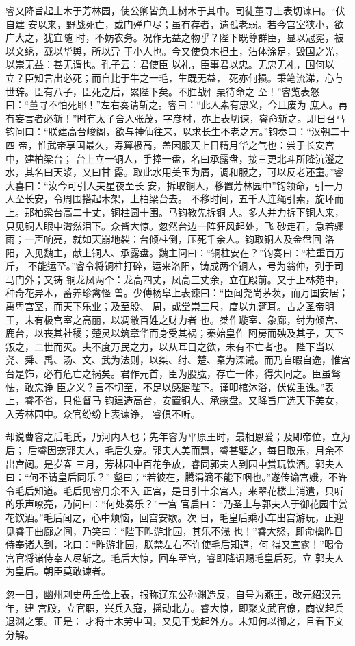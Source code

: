 睿又降旨起土木于芳林园，使公卿皆负土树木于其中。司徒董寻上表切谏曰。“伏自建
安以来，野战死亡，或门殚户尽；虽有存者，遗孤老弱。若今宫室狭小，欲广大之，犹宜随
时，不妨农务。况作无益之物乎？陛下既尊群臣，显以冠冕，被以文绣，载以华舆，所以异
于小人也。今又使负木担土，沾体涂足，毁国之光，以崇无益：甚无谓也。孔子云：君使臣
以礼，臣事君以忠。无忠无礼，国何以立？臣知言出必死；而自比于牛之一毛，生既无益，
死亦何损。秉笔流涕，心与世辞。臣有八子，臣死之后，累陛下矣。不胜战忄栗待命之
至！”睿览表怒曰：“董寻不怕死耶！”左右奏请斩之。睿曰：“此人素有忠义，今且废为
庶人。再有妄言者必斩！”时有太子舍人张茂，字彦材，亦上表切谏，睿命斩之。即日召马
钧问曰：“朕建高台峻阁，欲与神仙往来，以求长生不老之方。”钧奏曰：“汉朝二十四
帝，惟武帝享国最久，寿算极高，盖因服天上日精月华之气也：尝于长安宫中，建柏梁台；
台上立一铜人，手捧一盘，名曰承露盘，接三更北斗所降沆瀣之水，其名曰天浆，又曰甘
露。取此水用美玉为屑，调和服之，可以反老还童。”睿大喜曰：“汝今可引人夫星夜至长
安，拆取铜人，移置芳林园中”钧领命，引一万人至长安，令周围搭起木架，上柏梁台去。
不移时间，五千人连绳引索，旋环而上。那柏梁台高二十丈，铜柱圆十围。马钧教先拆铜
人。多人并力拆下铜人来，只见铜人眼中潸然泪下。众皆大惊。忽然台边一阵狂风起处，飞
砂走石，急若骤雨；一声响亮，就如天崩地裂：台倾柱倒，压死千余人。钧取铜人及金盘回
洛阳，入见魏主，献上铜人、承露盘。魏主问曰：“铜柱安在？”钧奏曰：“柱重百万斤，
不能运至。”睿令将铜柱打碎，运来洛阳，铸成两个铜人，号为翁仲，列于司马门外；又铸
铜龙凤两个：龙高四丈，凤高三丈余，立在殿前。又于上林苑中，种奇花异木，蓄养珍禽怪
兽。少傅杨阜上表谏曰：“臣闻尧尚茅茨，而万国安居；禹卑宫室，而天下乐业；及至殷、
周，或堂崇三尺，度以九筵耳。古之圣帝明王，未有极宫室之高丽，以凋敝百姓之财力者
也。桀作璇室、象廊，纣为倾宫、鹿台，以丧其社稷；楚灵以筑章华而身受其祸；秦始皇作
阿房而殃及其子，天下叛之，二世而灭。夫不度万民之力，以从耳目之欲，未有不亡者也。
陛下当以尧、舜、禹、汤、文、武为法则，以桀、纣、楚、秦为深诫。而乃自暇自逸，惟宫
台是饰，必有危亡之祸矣。君作元首，臣为股肱，存亡一体，得失同之。臣虽驽怯，敢忘诤
臣之义？言不切至，不足以感寤陛下。谨叩棺沐浴，伏俟重诛。”表上，睿不省，只催督马
钧建造高台，安置铜人、承露盘。又降旨广选天下美女，入芳林园中。众官纷纷上表谏诤，
睿俱不听。

却说曹睿之后毛氏，乃河内人也；先年睿为平原王时，最相恩爱；及即帝位，立为后；
后睿因宠郭夫人，毛后失宠。郭夫人美而慧，睿甚嬖之，每日取乐，月余不出宫闼。是岁春
三月，芳林园中百花争放，睿同郭夫人到园中赏玩饮酒。郭夫人曰：“何不请皇后同乐？”
壑曰；“若彼在，腾涓滴不能下咽也。”遂传谕宫娥，不许令毛后知道。毛后见睿月余不入
正宫，是日引十余宫人，来翠花楼上消遣，只听的乐声嘹亮，乃问曰：“何处奏乐？”一宫
官启曰：“乃圣上与郭夫人于御花园中赏花饮酒。”毛后闻之，心中烦恼，回宫安歇。次
日，毛皇后乘小车出宫游玩，正迎见睿于曲廊之间，乃笑曰：“陛下昨游北园，其乐不浅
也！”睿大怒，即命擒昨日侍奉诸人到，叱曰：“昨游北园，朕禁左右不许使毛后知道，何
得又宣露！”喝令宫官将诸侍奉人尽斩之。毛后大惊，回车至宫，睿即降诏赐毛皇后死，立
郭夫人为皇后。朝臣莫敢谏者。

忽一日，幽州刺史毋丘俭上表，报称辽东公孙渊造反，自号为燕王，改元绍汉元年，建
宫殿，立官职，兴兵入寇，摇动北方。睿大惊，即聚文武官僚，商议起兵退渊之策。正是：
才将土木劳中国，又见干戈起外方。未知何以御之，且看下文分解。